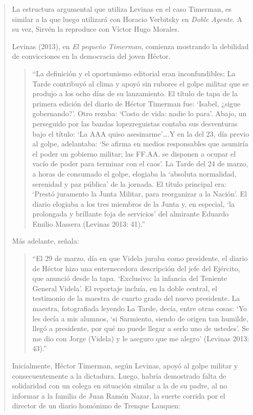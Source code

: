 \begin{quote}
La estructura argumental que utiliza Levinas en el caso Timerman, es similar a la que luego utilizará con Horacio Verbitsky en \emph{Doble Agente}. A su vez, Sirvén la reproduce con Víctor Hugo Morales.

Levinas (2013), en \emph{El pequeño Timerman}, comienza mostrando la debilidad de convicciones en la democracia del joven Héctor.
\begin{quote}
	\enquote{La definición y el oportunismo editorial eran inconfundibles; La Tarde contribuyó al clima y apoyó sin rubores el golpe militar que se produjo a los ocho días de su lanzamiento. El título de tapa de la primera edición del diario de Héctor Timerman fue: \enquote{Isabel, ¿sigue gobernando?}. Otro rezaba: \enquote{Costo de vida: nadie lo para}. Abajo, un perseguido por las bandas lopezreguistas contaba sus desventuras bajo el título: \enquote{La AAA quiso asesinarme}\dots.Y en la del 23, día previo al golpe, adelantaba: \enquote{Se afirma en medios responsables que asumiría el poder un gobierno militar; las FF.AA. se disponen a ocupar el vacío de poder para terminar con el caos}. La Tarde del 24 de marzo, a horas de consumado el golpe, elogiaba la \enquote{absoluta normalidad, serenidad y paz pública} de la jornada. El título principal era: \enquote{Prestó juramento la Junta Militar, para reorganizar a la Nación}. El diario elogiaba a los tres miembros de la Junta y, en especial, \enquote{la prolongada y brillante foja de servicios} del almirante Eduardo Emilio Massera (Levinas 2013: 41).}
\end{quote}

Más adelante, señala:

\begin{quote}
	\enquote{El 29 de marzo, día en que Videla juraba como presidente, el diario de Héctor hizo una enternecedora descripción del jefe del Ejército, que anunció desde la tapa. \enquote{Exclusivo: la infancia del Teniente General Videla}. El reportaje incluía, en la doble central, el testimonio de la maestra de cuarto grado del nuevo presidente. La maestra, fotografiada leyendo La Tarde, decía, entre otras cosas: \enquote{Yo les decía a mis alumnos, `si Sarmiento, siendo de origen tan humilde, llegó a presidente, por qué no puede llegar a serlo uno de ustedes'. Se me dio con Jorge (Videla) y le aseguro que me alegro} (Levinas 2013: 43).}
\end{quote}


Inicialmente, Héctor Timerman, según Levinas, apoyó al golpe militar y consecuentemente a la dictadura. Luego, habría demostrado falta de solidaridad con un colega en situación similar a la de su padre, al no informar a la familia de Juan Ramón Nazar, la suerte corrida por el director de un diario homónimo de Trenque Lauquen:


\end{quote}
